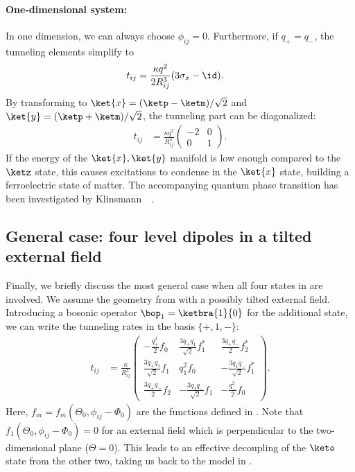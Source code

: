 \paragraph{One-dimensional system:}
In one dimension, we can always choose $\phi_{ij}=0$. Furthermore, if $q_+=q_-$, the tunneling
elements simplify to
\begin{align}
    t_{ij} &= \frac{\kappa q^2}{2R_{ij}^3} (3\sigma_x-\id).
\end{align}
By transforming to $\ket{x}=(\ketp-\ketm)/\sqrt{2}$ and $\ket{y}=(\ketp+\ketm)/\sqrt{2}$, the
tunneling part can be diagonalized:
\begin{align}
    t_{ij} &= \frac{\kappa q^2}{R_{ij}^3} \begin{pmatrix}
    -2 & 0 \\
    0 & 1
    \end{pmatrix}.
\end{align}
If the energy of the $\ket{x}, \ket{y}$ manifold is low enough compared to the $\ketz$ state, this
causes excitations to condense in the $\ket{x}$ state, building a ferroelectric state of matter. The accompanying quantum phase transition has been investigated by Klinsmann~\etal~\cite{Klinsmann2011,Klinsmann2014}.

\subsection{General case: four level dipoles in a tilted external field}
Finally, we briefly discuss the most general case when all four states in  are involved. We assume the geometry from  with a possibly tilted external field.
Introducing a bosonic operator $\bop_1=\ketbra{1}{0}$ for the additional state, we can write the tunneling rates in the basis $\{{+}, 1, {-}\}$:
\begin{align}
    t_{ij} &= \frac{\kappa}{R_{ij}^3} \begin{pmatrix}
    -\frac{q_+^2}{2} f_0 & \frac{3q_+ q_1}{\sqrt{2}} f_1^* & \frac{3q_+q_-}{2} f_2^* \\
    \frac{3q_+q_1}{\sqrt{2}} f_1 & q_1^2 f_0 & -\frac{3q_1q_-}{\sqrt{2}} f_1^* \\
    \frac{3q_+q_-}{2} f_2 & -\frac{3q_1q_-}{\sqrt{2}} f_1 & -\frac{q_-^2}{2} f_0
\end{pmatrix}.
\end{align}
Here, $f_m = f_m(\Theta_0, \phi_{ij}-\Phi_0)$ are the functions defined in .
Note that $f_1(\Theta_0, \phi_{ij}-\Phi_0)=0$ for an external field which is perpendicular to the two-dimensional plane ($\Theta=0$). This leads to an effective decoupling of the $\keto$ state from the other two, taking us back to the model in .
